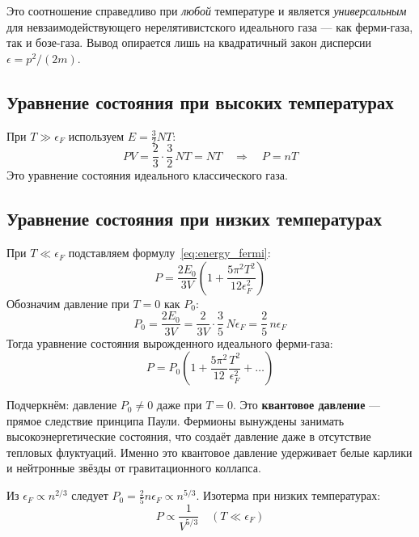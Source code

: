 \documentclass[../general/general]{subfiles}
\begin{document}
Это соотношение справедливо при \emph{любой} температуре и является \emph{универсальным} для невзаимодействующего нерелятивистского идеального газа --- как ферми-газа, так и бозе-газа. Вывод опирается лишь на квадратичный закон дисперсии $\epsilon = p^2/(2m)$.

\subsection{Уравнение состояния при высоких температурах}

При $T \gg \epsilon_F$ используем $E = \frac{3}{2}NT$:
\begin{equation}
    PV = \frac{2}{3}\cdot\frac{3}{2}\,NT = NT \quad \Longrightarrow \quad P = nT
\end{equation}
Это уравнение состояния идеального классического газа.

\subsection{Уравнение состояния при низких температурах}

При $T \ll \epsilon_F$ подставляем формулу~\eqref{eq:energy_fermi}:
\begin{equation}
    P = \frac{2E_0}{3V}\!\left(1 + \frac{5\pi^2 T^2}{12\epsilon_F^2}\right)
\end{equation}
Обозначим давление при $T = 0$ как $P_0$:
\begin{equation}
    P_0 = \frac{2E_0}{3V} = \frac{2}{3V}\cdot\frac{3}{5}\,N\epsilon_F = \frac{2}{5}\,n\epsilon_F
\end{equation}
Тогда уравнение состояния вырожденного идеального ферми-газа:
\begin{equation}
    \boxed{P = P_0\!\left(1 + \frac{5\pi^2}{12}\frac{T^2}{\epsilon_F^2} + \ldots\right)}
\end{equation}

Подчеркнём: давление $P_0 \neq 0$ даже при $T = 0$. Это \textbf{квантовое давление} --- прямое следствие принципа Паули. Фермионы вынуждены занимать высокоэнергетические состояния, что создаёт давление даже в отсутствие тепловых флуктуаций. Именно это квантовое давление удерживает белые карлики и нейтронные звёзды от гравитационного коллапса.

Из $\epsilon_F \propto n^{2/3}$ следует $P_0 = \frac{2}{5}n\epsilon_F \propto n^{5/3}$. Изотерма при низких температурах:
\begin{equation}
    P \propto \frac{1}{V^{5/3}} \quad (T \ll \epsilon_F)
\end{equation}
\end{document}
